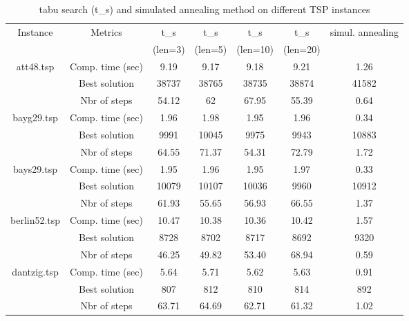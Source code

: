 \begin{table}[htbp]
  \centering

  \begin{tabular}{@{} |c|c|c|c|c|c|c| @{}}
    \hline
    Instance &Metrics & t\_s & t\_s  & t\_s & t\_s & simul. annealing \\ 
	&&  (len=3) & (len=5) &  (len=10) &  (len=20) &\\
    \hline
    \multirow{3}{*}{att48.tsp} & Comp. time (sec) & 9.19 & 9.17 & 9.18 & 9.21 & 1.26 \\ \cline{2-7}
    & Best solution & 38737 & 38765 & 38735 & 38874 & 41582 \\ \cline{2-7}
    & Nbr of steps & 54.12 & 62 & 67.95 & 55.39 & 0.64 \\ \cline{2-7}
    \hline

    \multirow{3}{*}{bayg29.tsp} & Comp. time (sec) & 1.96 & 1.98 & 1.95 & 1.96 & 0.34 \\ \cline{2-7}
    & Best solution & 9991 & 10045 & 9975 & 9943 & 10883 \\ \cline{2-7}
    & Nbr of steps & 64.55 & 71.37 & 54.31 & 72.79 & 1.72 \\ \cline{2-7}
    \hline	
    
    \multirow{3}{*}{bays29.tsp} & Comp. time (sec) & 1.95 & 1.96 & 1.95 & 1.97 & 0.33 \\ \cline{2-7}
    & Best solution & 10079 & 10107 & 10036 & 9960 & 10912 \\ \cline{2-7}
    & Nbr of steps & 61.93 & 55.65 & 56.93 & 66.55 & 1.37 \\ \cline{2-7}
    \hline
    
     \multirow{3}{*}{berlin52.tsp} & Comp. time (sec) & 10.47 & 10.38 & 10.36 & 10.42 & 1.57 \\ \cline{2-7}
    & Best solution & 8728 & 8702 & 8717 & 8692 & 9320 \\ \cline{2-7}
    & Nbr of steps & 46.25 & 49.82 & 53.40 & 68.94 & 0.59 \\ \cline{2-7}
    \hline	
     
      \multirow{3}{*}{dantzig.tsp} & Comp. time (sec) & 5.64 & 5.71 & 5.62 & 5.63 & 0.91 \\ \cline{2-7}
    & Best solution & 807 & 812 & 810 & 814 & 892 \\ \cline{2-7}
    & Nbr of steps & 63.71 & 64.69 & 62.71 & 61.32 & 1.02 \\ \cline{2-7}
    \hline		
 
  \end{tabular}
  
  \label{tabu}
    \caption{tabu search (t\_s) and simulated annealing method on different TSP instances}
\end{table}


